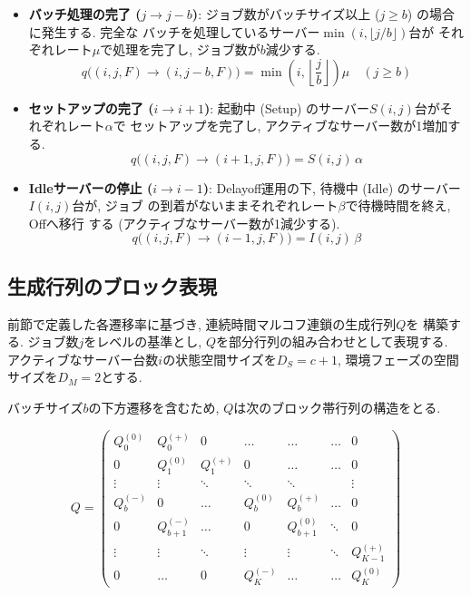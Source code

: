 \documentclass[a4paper, 11pt, dvipdfmx]{jsreport}
\begin{document}
\begin{itemize}
    \item \textbf{バッチ処理の完了 ($j \to j-b$)}:
    ジョブ数がバッチサイズ以上 ($j \ge b$) の場合に発生する. 完全な
    バッチを処理しているサーバー$\min(i, \lfloor j/b \rfloor)$台が
    それぞれレート$\mu$で処理を完了し, ジョブ数が$b$減少する. 
    \[ q\big((i, j, F) \to (i, j-b, F)\big)
        = \min\!\left(i, \left\lfloor \frac{j}{b} \right\rfloor\right)\mu
        \quad (j \ge b) \]

    \item \textbf{セットアップの完了 ($i \to i+1$)}:
    起動中 (Setup) のサーバー$S(i, j)$台がそれぞれレート$\alpha$で
    セットアップを完了し, アクティブなサーバー数が1増加する. 
    \[ q\big((i, j, F) \to (i+1, j, F)\big) = S(i, j)\, \alpha \]

    \item \textbf{Idleサーバーの停止 ($i \to i-1$)}:
    Delayoff運用の下, 待機中 (Idle) のサーバー$I(i, j)$台が, ジョブ
    の到着がないままそれぞれレート$\beta$で待機時間を終え, Offへ移行
    する (アクティブなサーバー数が1減少する). 
    \[ q\big((i, j, F) \to (i-1, j, F)\big) = I(i, j)\, \beta \]
\end{itemize}

\subsection{生成行列のブロック表現}
\label{sec:generator_matrix}
 
前節で定義した各遷移率に基づき, 連続時間マルコフ連鎖の生成行列$Q$を
構築する. ジョブ数$j$をレベルの基準とし, $Q$を部分行列の組み合わせとして表現する. アクティブなサーバー台数$i$の状態空間サイズを$D_S = c+1$, 環境フェーズの空間サイズを$D_M = 2$とする. 

バッチサイズ$b$の下方遷移を含むため, $Q$は次のブロック帯行列の構造をとる. 

\begin{equation}
\label{eq:block-band-Q}
    Q = \begin{pmatrix}
        Q^{(0)}_{0} & Q^{(+)}_{0} & 0 & \dots & \dots & \dots & 0 \\
        0 & Q^{(0)}_{1} & Q^{(+)}_{1} & 0 & \dots & \dots & 0 \\
        \vdots & \vdots & \ddots & \ddots & \ddots & & \vdots \\
        Q^{(-)}_{b} & 0 & \dots & Q^{(0)}_{b} & Q^{(+)}_{b} & \dots & 0 \\
        0 & Q^{(-)}_{b+1} & \dots & 0 & Q^{(0)}_{b+1} & \ddots & 0 \\
        \vdots & \vdots & \ddots & \vdots & \vdots & \ddots & Q^{(+)}_{K-1} \\
        0 & \dots & 0 & Q^{(-)}_{K} & \dots & \dots & Q^{(0)}_{K}
    \end{pmatrix}
\end{equation}
\end{document}

